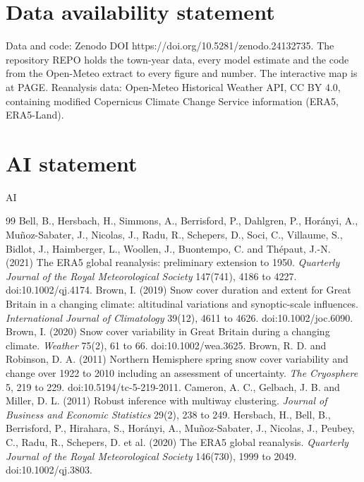 \documentclass[11pt,a4paper]{article}
\begin{document}
\section*{Data availability statement}
Data and code: Zenodo DOI https://doi.org/10.5281/zenodo.24132735. The repository {{REPO}} holds the town-year data, every model estimate and the code from the Open-Meteo extract to every figure and number. The interactive map is at {{PAGE}}. Reanalysis data: Open-Meteo Historical Weather API, CC BY 4.0, containing modified Copernicus Climate Change Service information (ERA5, ERA5-Land).

\section*{AI statement}
{{AI}}

\begin{thebibliography}{99}
 Bell, B., Hersbach, H., Simmons, A., Berrisford, P., Dahlgren, P., Horányi, A., Muñoz-Sabater, J., Nicolas, J., Radu, R., Schepers, D., Soci, C., Villaume, S., Bidlot, J., Haimberger, L., Woollen, J., Buontempo, C. and Thépaut, J.-N. (2021) The ERA5 global reanalysis: preliminary extension to 1950. \textit{Quarterly Journal of the Royal Meteorological Society} 147(741), 4186 to 4227. doi:10.1002/qj.4174.
 Brown, I. (2019) Snow cover duration and extent for Great Britain in a changing climate: altitudinal variations and synoptic-scale influences. \textit{International Journal of Climatology} 39(12), 4611 to 4626. doi:10.1002/joc.6090.
 Brown, I. (2020) Snow cover variability in Great Britain during a changing climate. \textit{Weather} 75(2), 61 to 66. doi:10.1002/wea.3625.
 Brown, R. D. and Robinson, D. A. (2011) Northern Hemisphere spring snow cover variability and change over 1922 to 2010 including an assessment of uncertainty. \textit{The Cryosphere} 5, 219 to 229. doi:10.5194/tc-5-219-2011.
 Cameron, A. C., Gelbach, J. B. and Miller, D. L. (2011) Robust inference with multiway clustering. \textit{Journal of Business and Economic Statistics} 29(2), 238 to 249.
 Hersbach, H., Bell, B., Berrisford, P., Hirahara, S., Horányi, A., Muñoz-Sabater, J., Nicolas, J., Peubey, C., Radu, R., Schepers, D. et al. (2020) The ERA5 global reanalysis. \textit{Quarterly Journal of the Royal Meteorological Society} 146(730), 1999 to 2049. doi:10.1002/qj.3803.

\end{thebibliography}
\end{document}
